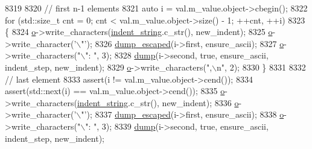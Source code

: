 \begin{DoxyCode}
8319 
8320                     \textcolor{comment}{// first n-1 elements}
8321                     \textcolor{keyword}{auto} i = val.m\_value.object->cbegin();
8322                     \textcolor{keywordflow}{for} (std::size\_t cnt = 0; cnt < val.m\_value.object->size() - 1; ++cnt, ++i)
8323                     \{
8324                         \hyperlink{classnlohmann_1_1detail_1_1serializer_acf3c88660d3cbc65fc71c4d84f2a9f59}{o}->write\_characters(\hyperlink{classnlohmann_1_1detail_1_1serializer_ae9268a10d88a5526e32735a55a132fc6}{indent\_string}.c\_str(), new\_indent);
8325                         \hyperlink{classnlohmann_1_1detail_1_1serializer_acf3c88660d3cbc65fc71c4d84f2a9f59}{o}->write\_character(\textcolor{charliteral}{'\(\backslash\)"'});
8326                         \hyperlink{classnlohmann_1_1detail_1_1serializer_ac1f8d1165b44149bd8be397dce68ea05}{dump\_escaped}(i->first, ensure\_ascii);
8327                         \hyperlink{classnlohmann_1_1detail_1_1serializer_acf3c88660d3cbc65fc71c4d84f2a9f59}{o}->write\_characters(\textcolor{stringliteral}{"\(\backslash\)": "}, 3);
8328                         \hyperlink{classnlohmann_1_1detail_1_1serializer_a95460ebd1a535a543e5a0ec52e00f48b}{dump}(i->second, \textcolor{keyword}{true}, ensure\_ascii, indent\_step, new\_indent);
8329                         \hyperlink{classnlohmann_1_1detail_1_1serializer_acf3c88660d3cbc65fc71c4d84f2a9f59}{o}->write\_characters(\textcolor{stringliteral}{",\(\backslash\)n"}, 2);
8330                     \}
8331 
8332                     \textcolor{comment}{// last element}
8333                     assert(i != val.m\_value.object->cend());
8334                     assert(std::next(i) == val.m\_value.object->cend());
8335                     \hyperlink{classnlohmann_1_1detail_1_1serializer_acf3c88660d3cbc65fc71c4d84f2a9f59}{o}->write\_characters(\hyperlink{classnlohmann_1_1detail_1_1serializer_ae9268a10d88a5526e32735a55a132fc6}{indent\_string}.c\_str(), new\_indent);
8336                     \hyperlink{classnlohmann_1_1detail_1_1serializer_acf3c88660d3cbc65fc71c4d84f2a9f59}{o}->write\_character(\textcolor{charliteral}{'\(\backslash\)"'});
8337                     \hyperlink{classnlohmann_1_1detail_1_1serializer_ac1f8d1165b44149bd8be397dce68ea05}{dump\_escaped}(i->first, ensure\_ascii);
8338                     \hyperlink{classnlohmann_1_1detail_1_1serializer_acf3c88660d3cbc65fc71c4d84f2a9f59}{o}->write\_characters(\textcolor{stringliteral}{"\(\backslash\)": "}, 3);
8339                     \hyperlink{classnlohmann_1_1detail_1_1serializer_a95460ebd1a535a543e5a0ec52e00f48b}{dump}(i->second, \textcolor{keyword}{true}, ensure\_ascii, indent\_step, new\_indent);

\end{DoxyCode}
